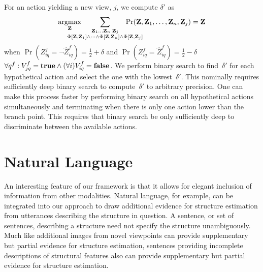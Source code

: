 \par\noindent
%
For an action yielding a new view, $j$, we compute $\delta'$ as
%
\begin{equation*}
  \argmax_{\mathbf{Z}}\hspace{-5ex}
  \sum_{\substack{\mathbf{Z}_1\ldots\mathbf{Z}_n\;\mathbf{Z}_j\\
      \Phi[\mathbf{Z},\mathbf{Z}_1]\wedge\cdots\wedge\Phi[\mathbf{Z},\mathbf{Z}_n]
      \wedge\Phi[\mathbf{Z},\mathbf{Z}_j]}}\hspace{-6ex}
  \Pr(\mathbf{Z},\mathbf{Z}_1,\ldots,\mathbf{Z}_n,\mathbf{Z}_j)=\mathbf{Z}
\end{equation*}
when
\begin{math}
    \Pr(Z^f_{iq}=\neg\hat{Z}^f_{iq})=\frac{1}{2}+\delta
\end{math}
and
\begin{math}
    \Pr(Z^f_{iq}=\hat{Z}^f_{iq})=\frac{1}{2}-\delta
\end{math}
$\forall q^f:V^f_{jq}=\mathbf{true}\wedge(\forall i)V^f_{iq}=\mathbf{false}$.
%
We perform binary search to find~$\delta'$ for each hypothetical action
and select the one with the lowest~$\delta'$.
%
This nominally requires sufficiently deep binary search to compute~$\delta'$ to
arbitrary precision.
%
One can make this process faster by performing binary search on all
hypothetical actions simultaneously and terminating when there is only one
action lower than the branch point.
%
This requires that binary search be only sufficiently deep to discriminate
between the available actions.

\par\vspace{-1ex}
\section{Natural Language}
\label{sec-ll2:language}

An interesting feature of our framework is that it allows for elegant inclusion
of information from other modalities.
%
Natural language, for example, can be integrated into our approach to draw
additional evidence for structure estimation from utterances describing the
structure in question.
%
A sentence, or set of sentences, describing a structure need not specify the
structure unambiguously.
%
Much like additional images from novel viewpoints can provide supplementary but
partial evidence for structure estimation, sentences providing incomplete
descriptions of structural features also can provide supplementary but partial
evidence for structure estimation.

